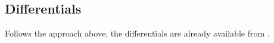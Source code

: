 \documentclass[internal,english]{sintefmemo2012}
\newcommand{\excess}{\text{E}}
\begin{document}
\subsection{Differentials}
Follows the approach above, the differentials are already available
from \cite{Wilhelmsen2013}.
\clearpage


\end{document}
